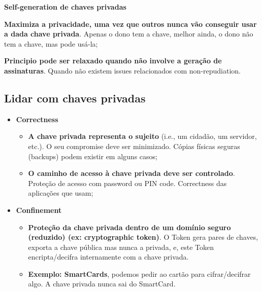 \documentclass{article}
\begin{document}
\textbf{Self-generation de chaves privadas}

\begin{flushleft}
  \textbf{Maximiza a privacidade, uma vez que outros nunca vão conseguir usar
  a dada chave privada}. Apenas o dono tem a chave, melhor ainda,
  o dono não tem a chave, mas pode usá-la;

  \vspace{2mm}

  \textbf{Principio pode ser relaxado quando não involve a geração de assinaturas}.
  Quando não existem issues relacionados com non-repudiation.
\end{flushleft}

\subsection{Lidar com chaves privadas}

\begin{itemize}
  \item \textbf{Correctness}
  
  \begin{itemize}
    \item \textbf{A chave privada representa o sujeito} (i.e., um cidadão, um servidor, etc.).
    O seu compromise deve ser minimizado. Cópias físicas seguras (backups) podem existir em alguns casos;

    \item \textbf{O caminho de acesso à chave privada deve ser controlado}.
    Proteção de acesso com password ou PIN code. Correctness das aplicações que usam;
  \end{itemize}

  \item \textbf{Confinement}
  \begin{itemize}
    \item \textbf{Proteção da chave privada dentro de um domínio seguro (reduzido) (ex: cryptographic token)}.
    O Token gera pares de chaves, exporta a chave pública mas nunca a privada, e, este Token
    encripta/decifra internamente com a chave privada.

    \item \textbf{Exemplo: SmartCards}, podemos pedir ao cartão para cifrar/decifrar
    algo. A chave privada nunca sai do SmartCard.
  \end{itemize}
\end{itemize}

\pagebreak
\end{document}
